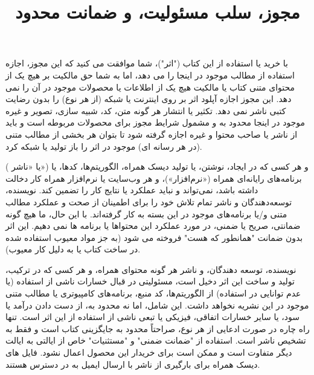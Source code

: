     {
    \vspace*{\fill}
    \title{
        \center \Huge
        \textbf{مجوز، سلب مسئولیت، و ضمانت محدود}
        \\[20pt]
    }
    { \Large

    با خرید یا استفاده از این کتاب ("اثر")، شما موافقت می کنید که این مجوز، اجازه استفاده از مطالب موجود در اینجا را می دهد، اما به شما حق مالکیت بر هیچ یک از محتوای متنی کتاب یا مالکیت هیچ یک از اطلاعات یا محصولات موجود در آن را نمی دهد.
    این مجوز اجازه آپلود اثر بر روی اینترنت یا شبکه (از هر نوع) را بدون رضایت کتبی ناشر نمی دهد.
    تکثیر یا انتشار هر گونه متن، کد، شبیه سازی، تصویر و غیره موجود در اینجا محدود به و مشمول شرایط مجوز برای محصولات مربوطه است و باید از ناشر یا صاحب محتوا و غیره اجازه گرفته شود تا بتوان هر بخشی از مطالب متنی (در هر رسانه ای) موجود در اثر را باز تولید یا شبکه کرد.

     ( یا «ناشر») و هر کسی که در ایجاد، نوشتن، یا تولید دیسک همراه، الگوریتم‌ها، کدها، یا برنامه‌های رایانه‌ای همراه («نرم‌افزار»)، و هر وب‌سایت یا نرم‌افزار همراه کار دخالت داشته باشد، نمی‌تواند و نباید عملکرد یا نتایج کار را تضمین کند.
    نویسنده، توسعه‌دهندگان و ناشر تمام تلاش خود را برای اطمینان از صحت و عملکرد مطالب متنی و/یا برنامه‌های موجود در این بسته به کار گرفته‌اند.
    با این حال، ما هیچ گونه ضمانتی، صریح یا ضمنی، در مورد عملکرد این محتواها یا برنامه ها نمی دهیم.
    این اثر بدون ضمانت "همانطور که هست" فروخته می شود (به جز مواد معیوب استفاده شده در ساخت کتاب یا به دلیل کار معیوب).

    نویسنده، توسعه دهندگان، و ناشر هر گونه محتوای همراه، و هر کسی که در ترکیب، تولید و ساخت این اثر دخیل است، مسئولیتی در قبال خسارات ناشی از استفاده (یا عدم توانایی در استفاده) از الگوریتم‌ها، کد منبع، برنامه‌های کامپیوتری یا مطالب متنی موجود در این نشریه نخواهد داشت.
    این شامل، اما نه محدود به، از دست دادن درآمد یا سود، یا سایر خسارات اتفاقی، فیزیکی یا تبعی ناشی از استفاده از این اثر است.
    تنها راه چاره در صورت ادعایی از هر نوع، صراحتاً محدود به جایگزینی کتاب است و فقط به تشخیص ناشر است.
    استفاده از "ضمانت ضمنی" و "مستثنیات" خاص از ایالتی به ایالت دیگر متفاوت است و ممکن است برای خریدار این محصول اعمال نشود.
    فایل های دیسک همراه برای بارگیری از ناشر با ارسال ایمیل به  در دسترس هستند.
    }
    \vspace*{\fill}
}


